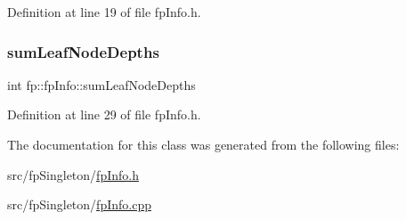 Definition at line 19 of file fp\+Info.\+h.

\mbox{\label{classfp_1_1fpInfo_a13afa17097728f059e8525ea382b71cd}} 
\subsubsection{\texorpdfstring{sum\+Leaf\+Node\+Depths}{sumLeafNodeDepths}}
{\footnotesize\ttfamily int fp\+::fp\+Info\+::sum\+Leaf\+Node\+Depths\hspace{0.3cm}{\ttfamily [protected]}}



Definition at line 29 of file fp\+Info.\+h.



The documentation for this class was generated from the following files\+:\begin{DoxyCompactItemize}
\item 
src/fp\+Singleton/\hyperlink{fpInfo_8h}{fp\+Info.\+h}\item 
src/fp\+Singleton/\hyperlink{fpInfo_8cpp}{fp\+Info.\+cpp}\end{DoxyCompactItemize}
